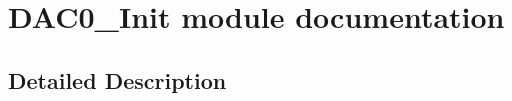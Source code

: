 \hypertarget{group___d_a_c0___init__module}{}\section{D\+A\+C0\+\_\+\+Init module documentation}
\label{group___d_a_c0___init__module}


\subsection{Detailed Description}
